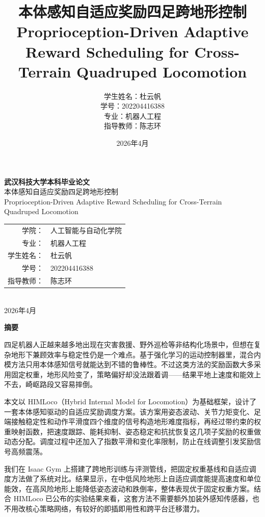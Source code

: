 \documentclass[12pt,a4paper]{ctexart}
\title{本体感知自适应奖励四足跨地形控制\\
\large{Proprioception-Driven Adaptive Reward Scheduling for Cross-Terrain Quadruped Locomotion}}
\author{学生姓名：杜云帆\\
学\hspace{2em}号：202204416388\\
专\hspace{2em}业：机器人工程\\
指导教师：陈志环}
\date{2026年4月}
\renewcommand{\arraystretch}{1.18}
\numberwithin{equation}{section}
\numberwithin{table}{section}
\numberwithin{figure}{section}
\begin{document}
\thispagestyle{empty}
\begin{center}
\vspace*{1.6cm}
{\textbf{武汉科技大学本科毕业论文}}\\[2.2cm]
{\coverkaiti{}本体感知自适应奖励四足跨地形控制}\\[0.8cm]
{Proprioception-Driven Adaptive Reward Scheduling for Cross-Terrain\\[0.2cm]Quadruped Locomotion}\\[2.4cm]
{\renewcommand{\arraystretch}{1.45}
{
\begin{tabular}{rl}
学院： & 人工智能与自动化学院 \\
专业： & 机器人工程 \\
学生姓名： & 杜云帆 \\
学号： & 202204416388 \\
指导教师： & 陈志环 \\
\end{tabular}}}\\[2.2cm]
{2026年4月}
\end{center}

\newpage
\pagestyle{frontstyle}
\vspace*{1em}
\begin{center}
{\headingfont\bfseries{}摘\hspace{1em}要}
\end{center}
\vspace{1em}
\begin{spacing}{1.5}
四足机器人正越来越多地出现在灾害救援、野外巡检等非结构化场景中，但想在复杂地形下兼顾效率与稳定性仍是一个难点。基于强化学习的运动控制器里，混合内模方法只用本体感知信号就能达到不错的鲁棒性。不过这类方法的奖励函数大多采用固定权重，地形风险变了，策略偏好却没法跟着调——结果平地上速度和能效上不去，崎岖路段又容易摔倒。

本文以 HIMLoco（Hybrid Internal Model for Locomotion）为基础框架，设计了一套本体感知驱动的自适应奖励调度方案。该方案用姿态波动、关节力矩变化、足端接触稳定性和动作平滑度四个维度的信号构造地形难度指标，再经过带约束的权重映射函数，把速度跟踪、能耗抑制、姿态稳定和抗扰恢复这几项子奖励的权重做动态分配。调度过程中还加入了指数平滑和变化率限制，防止在线调整引发奖励信号高频震荡。

我们在 Isaac Gym 上搭建了跨地形训练与评测管线，把固定权重基线和自适应调度方法做了系统对比。结果显示，在中低风险地形上自适应调度能提高速度和单位能效，在高风险地形上能降低姿态波动和跌倒率，整体表现优于固定权重方案。结合 HIMLoco 已公布的实验结果来看，这套方法不需要额外加装外感知传感器，也不用改核心策略网络，有较好的即插即用性和跨平台迁移潜力。

\vspace{1em}
\end{spacing}
\end{document}
